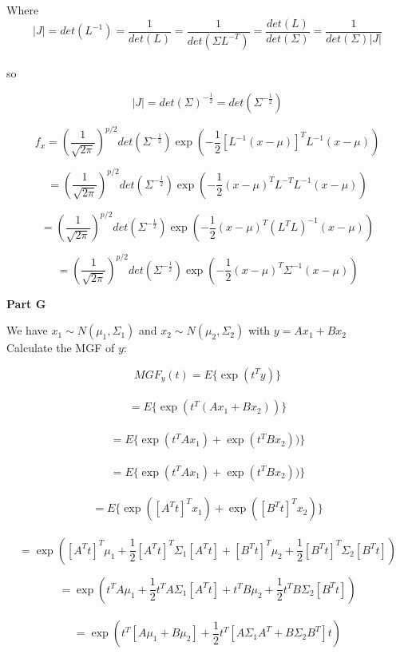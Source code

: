 \documentclass[12pt]{amsart}
\begin{document}
Where \\
$$|J| = det(L^{-1}) = \frac{1}{det(L)} = \frac{1}{det(\Sigma L^{-T}) } = \frac{det(L)}{det(\Sigma)}=\frac{1}{det(\Sigma)|J|}$$\\

so 

$$|J| = det(\Sigma)^{-\frac{1}{2}} = det(\Sigma^{-\frac{1}{2}})  $$

 $$f_x = \left(\frac{1}{\sqrt{2\pi}} \right)^{p/2} det(\Sigma^{-\frac{1}{2}}) \exp\left(-\frac{1}{2} [L^{-1}(x - \mu)]^TL^{-1}(x - \mu)\right) $$

 $$= \left(\frac{1}{\sqrt{2\pi}} \right)^{p/2} det(\Sigma^{-\frac{1}{2}}) \exp\left(-\frac{1}{2} (x - \mu)^TL^{-T}L^{-1}(x - \mu)\right) $$

 $$= \left(\frac{1}{\sqrt{2\pi}} \right)^{p/2} det(\Sigma^{-\frac{1}{2}}) \exp\left(-\frac{1}{2} (x - \mu)^T(L^TL)^{-1}(x - \mu)\right) $$
 
  $$= \left(\frac{1}{\sqrt{2\pi}} \right)^{p/2} det(\Sigma^{-\frac{1}{2}}) \exp\left(-\frac{1}{2} (x - \mu)^T\Sigma^{-1}(x -\mu)\right) $$


{\bf Part G}\\
\bigskip

We have $ x_1\sim N(\mu_1, \Sigma_1) $ and $ x_2\sim N(\mu_2, \Sigma_2) $ with $y=Ax_1 + Bx_2$\\

Calculate the MGF of $y$:

$$MGF_y(t) = E\{\exp(t^Ty)    \}     $$\\

$$= E\{\exp(t^T(Ax_1 + Bx_2))    \}     $$\\


$$= E\{\exp(t^TAx_1) +  \exp(t^T Bx_2))    \}     $$\\


$$= E\{\exp(t^TAx_1) +  \exp(t^T Bx_2))    \}     $$\\


$$= E\{\exp( [A^Tt]^T x_1   ) +  \exp([B^Tt]^T x_2 )    \}     $$\\

$$ = \exp\left(  [A^Tt]^T\mu_1  + \frac{1}{2}[A^Tt]^T \Sigma_1 [A^Tt]  +  [B^Tt]^T\mu_2  + \frac{1}{2}[B^Tt]^T \Sigma_2 [B^Tt]\right)  $$


$$ = \exp\left(  t^TA \mu_1  + \frac{1}{2}t^TA \Sigma_1 [A^Tt]  +  t^TB\mu_2  + \frac{1}{2}t^TB \Sigma_2 [B^Tt]\right)  $$\\


$$ = \exp\left( t^T[A\mu_1 + B\mu_2] + \frac{1}{2}t^T[A\Sigma_1A^T+B\Sigma_2 B^T]t          \right)  $$\\
\end{document}
